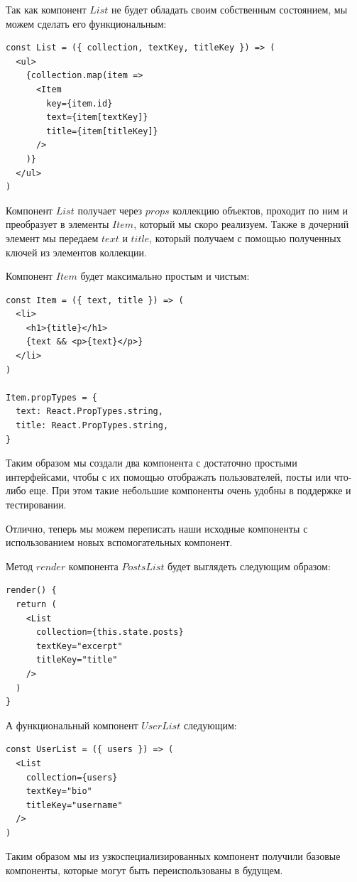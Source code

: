 Так как компонент $List$ не будет обладать своим собственным состоянием, мы можем сделать его функциональным:

\begin{lstlisting}
const List = ({ collection, textKey, titleKey }) => (
  <ul>
    {collection.map(item =>
      <Item
        key={item.id}
        text={item[textKey]}
        title={item[titleKey]}
      /> 
    )}
  </ul> 
)
\end{lstlisting}

Компонент $List$ получает через $props$ коллекцию объектов, проходит по ним и преобразует в элементы $Item$, который мы скоро реализуем. Также в дочерний элемент мы передаем $text$ и $title$, который получаем с помощью полученных ключей из элементов коллекции.

Компонент $Item$ будет максимально простым и чистым:

\begin{lstlisting}
const Item = ({ text, title }) => (
  <li>
    <h1>{title}</h1>
    {text && <p>{text}</p>}
  </li>
)

Item.propTypes = {
  text: React.PropTypes.string,
  title: React.PropTypes.string,
}
\end{lstlisting}

Таким образом мы создали два компонента с достаточно простыми интерфейсами, чтобы с их помощью отображать пользователей, посты или что-либо еще. При этом такие небольшие компоненты очень удобны в поддержке и тестировании.

Отлично, теперь мы можем переписать наши исходные компоненты с использованием новых вспомогательных компонент.

Метод $render$ компонента $PostsList$ будет выглядеть следующим образом:

\begin{lstlisting}
render() {
  return (
    <List
      collection={this.state.posts}
      textKey="excerpt"
      titleKey="title"
    />
  )
}
\end{lstlisting}

А функциональный компонент $UserList$ следующим:

\begin{lstlisting}
const UserList = ({ users }) => (
  <List
    collection={users}
    textKey="bio"
    titleKey="username"
  /> 
)
\end{lstlisting}

Таким образом мы из узкоспециализированных компонент получили базовые компоненты, которые могут быть переиспользованы в будущем.

